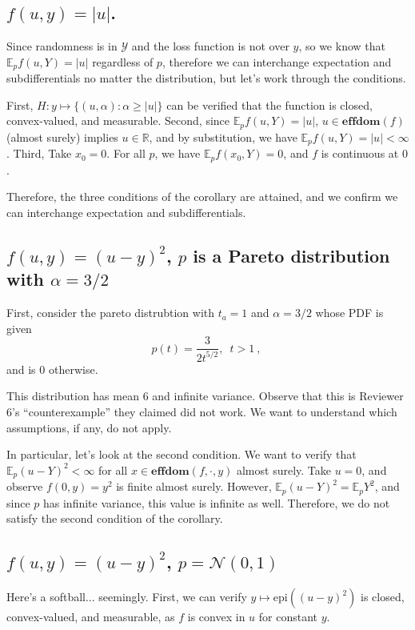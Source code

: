 \documentclass[12pt]{article}
\newcommand{\reals}{\mathbb{R}}
\newcommand{\E}{\mathbb{E}}
\newcommand{\Y}{\mathcal{Y}}
\newcommand{\effdom}{\mathbf{effdom}}
\newcommand{\epi}{\mathrm{epi}}
\begin{document}
\subsection{$f(u,y) = |u|$.}

Since randomness is in $\Y$ and the loss function is not over $y$, so we know that $\E_p f(u,Y) = |u|$ regardless of $p$, therefore we can interchange expectation and subdifferentials no matter the distribution, but let's work through the conditions.

First, $H : y \mapsto \{(u,\alpha) : \alpha \geq |u| \}$ can be verified that the function is closed, convex-valued, and measurable.
Second, since $\E_p f(u,Y) = |u|$, $u \in \effdom(f)$ (almost surely) implies $u \in \reals$, and by substitution, we have $\E_p f(u,Y) = |u| < \infty$.
Third, Take $x_0 = 0$.  For all $p$, we have $\E_p f(x_0, Y) = 0$, and $f$ is continuous at $0$.

Therefore, the three conditions of the corollary are attained, and we confirm we can interchange expectation and subdifferentials.


\subsection{$f(u,y) = (u-y)^2$, $p$ is a Pareto distribution with $\alpha = 3/2$}
First, consider the pareto distrubtion with $t_a = 1$ and $\alpha = 3/2$ whose PDF is given 
\begin{equation*}
p(t) = \frac{3}{2t^{5/2}}, \,\,\, t > 1~,~
\end{equation*}
and is $0$ otherwise.

This distribution has mean $6$ and infinite variance.
Observe that this is Reviewer 6's ``counterexample'' they claimed did not work.
We want to understand which assumptions, if any, do not apply.

In particular, let's look at the second condition.
We want to verify that $\E_p (u-Y)^2 < \infty$ for all $x \in \effdom (f, \cdot, y)$ almost surely.
Take $u = 0$, and observe $f(0,y) = y^2$ is finite almost surely. 
However, $\E_p (u-Y)^2 = \E_p Y^2$, and since $p$ has infinite variance, this value is infinite as well.
Therefore, we do not satisfy the second condition of the corollary.


\subsection{$f(u,y) = (u-y)^2$, $p = \mathcal{N}(0,1)$}
Here's a softball... seemingly.
First, we can verify $y \mapsto \epi((u-y)^2)$ is closed, convex-valued, and measurable, as $f$ is convex in $u$ for constant $y$.
\end{document}
